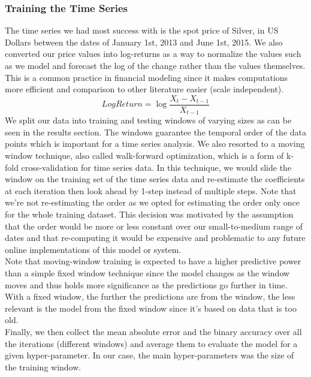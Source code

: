 \subsubsection{Training the Time Series}
The time series we had most success with is the spot price of Silver, in US Dollars between the dates of January 1st, 2013 and June 1st, 2015. We also converted our price values into log-returns as a way to normalize the values such as we model and forecast the log of the change rather than the values themselves. This is a common practice in financial modeling since it makes computations more efficient and comparison to other literature easier (scale independent). \cite{tsay} 
$$LogReturn = \log{\frac{X_t - X_{t-1}}{X_{t-1}}}$$
We split our data into training and testing windows of varying sizes as can be seen in the results section. The windows guarantee the temporal order of the data points which is important for a time series analysis. We also resorted to a moving window technique, also called walk-forward optimization, which is a form of k-fold cross-validation for time series data. In this technique, we would slide the window on the training set of the time series data and re-estimate the coefficients at each iteration then look ahead by 1-step instead of multiple steps. Note that we're not re-estimating the order as we opted for estimating the order only once for the whole training dataset. This decision was motivated by the assumption that the order would be more or less constant over our small-to-medium range of dates and that re-computing it would be expensive and problematic to any future online implementations of this model or system.\\
Note that moving-window training is expected to have a higher predictive power than a simple fixed window technique since the model changes as the window moves and thus holds more significance as the predictions go further in time. With a fixed window, the further the predictions are from the window, the less relevant is the model from the fixed window since it's based on data that is too old. \\
Finally, we then collect the mean absolute error and the binary accuracy over all the iterations (different windows) and average them to evaluate the model for a given hyper-parameter. In our case, the main hyper-parameters was the size of the training window.\\

